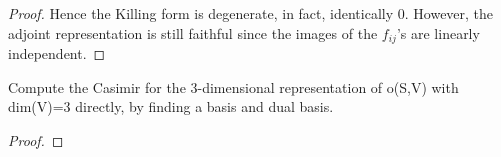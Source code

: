 \documentclass{article}
\begin{document}
\begin{proof}
Hence the Killing form is degenerate, in fact, identically 0.  However, the adjoint representation is still faithful since the images of the $f_{ij}$'s are linearly independent.
\end{proof}
 Compute the Casimir for the 3-dimensional representation of o(S,V) with dim(V)=3 directly, by finding a basis and dual basis.
\begin{proof}

\end{proof}
\end{document}
